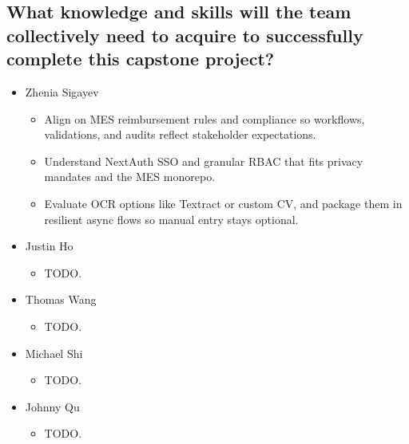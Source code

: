 \documentclass[12pt]{article}
\begin{document}
  \subsection{What knowledge and skills will the team collectively need to acquire to
    successfully complete this capstone project?}
  \begin{itemize}
    \item Zhenia Sigayev
      \begin{itemize}[label=$\circ$]
        \item Align on MES reimbursement rules and compliance so workflows, validations, and audits reflect stakeholder expectations.
        \item Understand NextAuth SSO and granular RBAC that fits privacy mandates and the MES monorepo.
        \item Evaluate OCR options like Textract or custom CV, and package them in resilient async flows so manual entry stays optional.
      \end{itemize}
    \item Justin Ho
      \begin{itemize}[label=$\circ$]
        \item TODO.
      \end{itemize}
    \item Thomas Wang
      \begin{itemize}[label=$\circ$]
        \item TODO.
      \end{itemize}
    \item Michael Shi
      \begin{itemize}[label=$\circ$]
        \item TODO.
      \end{itemize}
    \item Johnny Qu
      \begin{itemize}[label=$\circ$]
        \item TODO.
      \end{itemize}
  \end{itemize}
\end{document}
